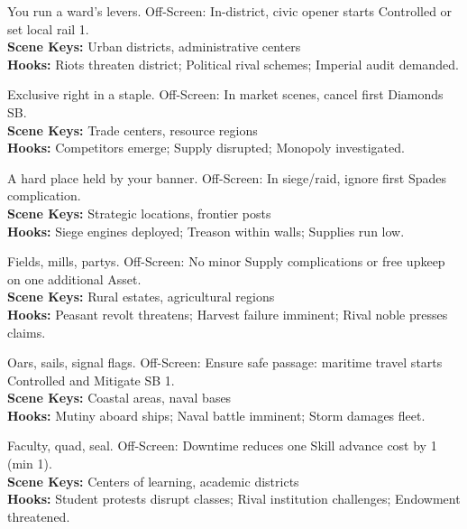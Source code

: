 \documentclass[12pt]{article}
\begin{document}
\begin{description}[leftmargin=*]
  \item[\textbf{City District License}] You run a ward's levers. Off-Screen: In-district, civic opener starts Controlled or set local rail 1. \\
  \textbf{Scene Keys:} Urban districts, administrative centers \\
  \textbf{Hooks:} Riots threaten district; Political rival schemes; Imperial audit demanded.

  \item[\textbf{Regional Monopoly}] Exclusive right in a staple. Off-Screen: In market scenes, cancel first Diamonds SB. \\
  \textbf{Scene Keys:} Trade centers, resource regions \\
  \textbf{Hooks:} Competitors emerge; Supply disrupted; Monopoly investigated.

  \item[\textbf{Fortress/Stronghold}] A hard place held by your banner. Off-Screen: In siege/raid, ignore first Spades complication. \\
  \textbf{Scene Keys:} Strategic locations, frontier posts \\
  \textbf{Hooks:} Siege engines deployed; Treason within walls; Supplies run low.

  \item[\textbf{Large Estate/Demesne}] Fields, mills, partys. Off-Screen: No minor Supply complications or free upkeep on one additional Asset. \\
  \textbf{Scene Keys:} Rural estates, agricultural regions \\
  \textbf{Hooks:} Peasant revolt threatens; Harvest failure imminent; Rival noble presses claims.

  \item[\textbf{Naval Fleet Share}] Oars, sails, signal flags. Off-Screen: Ensure safe passage: maritime travel starts Controlled and Mitigate SB 1. \\
  \textbf{Scene Keys:} Coastal areas, naval bases \\
  \textbf{Hooks:} Mutiny aboard ships; Naval battle imminent; Storm damages fleet.

  \item[\textbf{University College}] Faculty, quad, seal. Off-Screen: Downtime reduces one Skill advance cost by 1 (min 1). \\
  \textbf{Scene Keys:} Centers of learning, academic districts \\
  \textbf{Hooks:} Student protests disrupt classes; Rival institution challenges; Endowment threatened.


\end{description}
\end{document}

